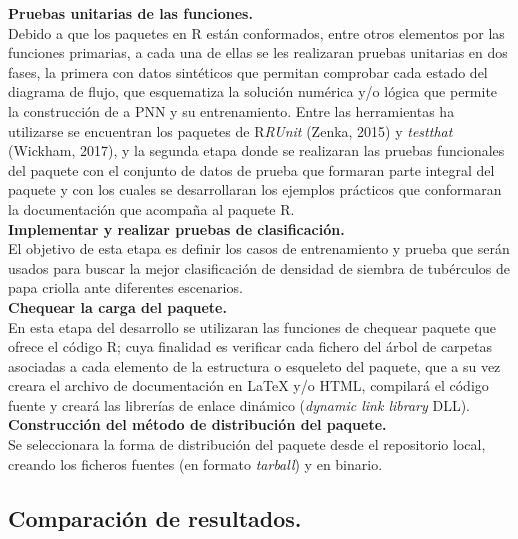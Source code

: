 \noindent
\textbf{Pruebas unitarias de las funciones.}\\

Debido a que los paquetes en R están conformados, entre otros elementos por las funciones primarias, a cada una de ellas se les realizaran pruebas unitarias en dos fases, la primera con datos sintéticos que permitan comprobar cada estado del diagrama de flujo, que esquematiza la solución numérica y/o lógica que permite la construcción de a PNN y su entrenamiento. Entre las herramientas ha utilizarse se encuentran los paquetes de R\emph{RUnit} (Zenka, 2015) y \emph{testthat} (Wickham, 2017), y la segunda etapa donde se realizaran las pruebas funcionales del paquete con el conjunto de datos de prueba que formaran parte integral del paquete y con los cuales se desarrollaran los ejemplos prácticos que conformaran la documentación que acompaña al paquete R.\\

\noindent
\textbf{Implementar y realizar pruebas de clasificación.}\\

El objetivo de esta etapa es definir los casos de entrenamiento y prueba que serán usados para buscar la mejor clasificación de densidad de siembra de tubérculos de papa criolla  ante diferentes escenarios.\\

 
  
\noindent
\textbf{Chequear la carga del paquete.}\\

En esta etapa del desarrollo se utilizaran las funciones de chequear paquete que ofrece el código R; cuya finalidad es verificar cada fichero del árbol de carpetas asociadas a cada elemento de la estructura o esqueleto del paquete, que a su vez creara el archivo de documentación en LaTeX y/o HTML, compilará el código fuente y creará las librerías de enlace dinámico (\emph{dynamic link library} DLL).\\  

\noindent
\textbf{Construcci\'on del m\'etodo de distribuci\'on del paquete.}\\

Se seleccionara la forma de distribución del paquete desde el repositorio local, creando los ficheros fuentes  (en formato  \emph{tarball})  y en binario.\\


\subsection{Comparación de resultados.}

